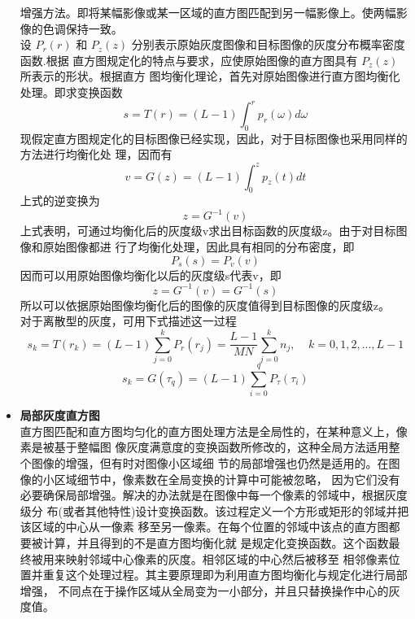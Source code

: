 \documentclass{ctexart}
\begin{document}
\begin{itemize}
增强方法。即将某幅影像或某一区域的直方图匹配到另一幅影像上。使两幅影像的色调保持一致。\\
设 $P_r(r)$ 和 $P_z(z)$ 分别表示原始灰度图像和目标图像的灰度分布概率密度函数.根据
直方图规定化的特点与要求，应使原始图像的直方图具有 $P_z(z)$ 所表示的形状。根据直方
图均衡化理论，首先对原始图像进行直方图均衡化处理。即求变换函数
\[
    s = T(r) = (L-1) \int_0^r p_r(\omega)d\omega
\]
现假定直方图规定化的目标图像已经实现，因此，对于目标图像也采用同样的方法进行均衡化处
理，因而有
\[
    v = G(z) = (L-1) \int_0^z p_z(t)dt
\]
上式的逆变换为
\[
    z = G^{-1}(v)
\]
上式表明，可通过均衡化后的灰度级v求出目标函数的灰度级z。由于对目标图像和原始图像都进
行了均衡化处理，因此具有相同的分布密度，即
\[
    P_s(s) = P_v(v)
\]
因而可以用原始图像均衡化以后的灰度级s代表v，即
\[
    z = G^{-1}(v) = G^{-1}(s)
\]
所以可以依据原始图像均衡化后的图像的灰度值得到目标图像的灰度级z。\\
对于离散型的灰度，可用下式描述这一过程
\[
    s_k = T(r_k) = (L-1)\sum_{j=0}^k P_r(r_j) = \frac{L-1}{MN} 
    \sum_{j=0}^k n_j, ~~~~~ k = 0,1,2,...,L-1
\]
\[
    s_k = G(\tau_q) = (L-1) \sum_{i=0}^q P_\tau(\tau_i)
\]
\item \textbf{局部灰度直方图}\\
直方图匹配和直方图均匀化的直方图处理方法是全局性的，在某种意义上，像素是被基于整幅图
像灰度满意度的变换函数所修改的，这种全局方法适用整个图像的增强，但有时对图像小区域细
节的局部增强也仍然是适用的。在图像的小区域细节中，像素数在全局变换的计算中可能被忽略，
因为它们没有必要确保局部增强。解决的办法就是在图像中每一个像素的邻域中，根据灰度级分
布(或者其他特性)设计变换函数。该过程定义一个方形或矩形的邻域并把该区域的中心从一像素
移至另一像素。在每个位置的邻域中该点的直方图都要被计算，并且得到的不是直方图均衡化就
是规定化变换函数。这个函数最终被用来映射邻域中心像素的灰度。相邻区域的中心然后被移至
相邻像素位置并重复这个处理过程。其主要原理即为利用直方图均衡化与规定化进行局部增强，
不同点在于操作区域从全局变为一小部分，并且只替换操作中心的灰度值。
\end{itemize}
\end{document}
